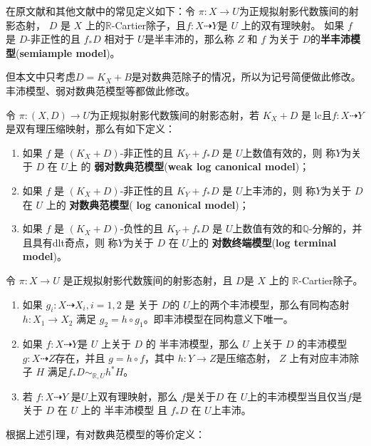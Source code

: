 \begin{remark}
  在原文献和其他文献中的常见定义如下：令 $ \pi:X\to U $为正规拟射影代数簇间的射影态射， $D$ 是 $X$ 上的$\mathbb{R}$-Cartier除子，且$ f: X\dashrightarrow Y $是 $U$ 上的双有理映射。  如果 $ f $ 是 $ D $-非正性的且 $ f_*D $ 相对于 $ U $是半丰沛的，那么称 $Z$ 和 $f$ 为关于 $D$的\textbf{半丰沛模型}(\textbf{semiample model})。

  但本文中只考虑$D=K_{X}+B$是对数典范除子的情况，所以为记号简便做此修改。丰沛模型、弱对数典范模型等都做此修改。
\end{remark}
\begin{definition}\label{models}
  \cite[Definition 3.6.7]{BCHM10} 令 $ \pi:(X,D)\to U $为正规拟射影代数簇间的射影态射，若 $ K_X+D $ 是 lc且$ f:X\dashrightarrow Y $是双有理压缩映射，那么有如下定义：
  \begin{enumerate}
    \item 如果 $f$ 是  $ (K_X+D) $-非正性的且 $ K_Y+f_*D $ 是 $ U $上数值有效的，则  称$ Y $为关于 $D$ 在 $U$上 的  \textbf{弱对数典范模型}(\textbf{weak log canonical model})；
    \item 如果 $f$ 是  $ (K_X+D) $-非正性的且 $ K_Y+f_*D $ 是 $ U $上丰沛的，则  称$ Y $为关于 $D$ 在 $U$ 上的  \textbf{对数典范模型}(\textbf{ log canonical model})；
    \item 如果 $f$ 是  $ (K_X+D) $-负性的且 $ K_Y+f_*D $ 是 $ U $上数值有效的和$\mathbb{Q}$-分解的，并且具有dlt奇点，则  称$ Y $为关于 $D$ 在 $U$上的  \textbf{对数终端模型}(\textbf{log terminal model})。
  \end{enumerate}
\end{definition}

\begin{lemma}\cite[lemma 3.6.6]{BCHM10}
  令 $\pi:X \to U$ 是正规拟射影代数簇间的射影态射，且 $D$是 $X$ 上的 $\mathbb{R}$-Cartier除子。

  \begin{enumerate}
    \item 如果 $g_{i}:X \dashrightarrow X_{i}, i=1,2$ 是 关于 $D$的  $U$上的两个丰沛模型，那么有同构态射 $h:X_{1}\to X_{2}$ 满足 $g_{2}=h \circ g_{1}$。即丰沛模型在同构意义下唯一。
    \item 如果 $f:X \dashrightarrow Y$是 $U$ 上关于 $D$ 的 半丰沛模型，那么 $U$ 上关于 $D$ 的丰沛模型 $g:X \dashrightarrow  Z$存在，并且 $g=h \circ f$，其中 $h:Y \to Z$是压缩态射， $Z$ 上有对应丰沛除子 $H$  满足$f_*D \sim_{\mathbb{R},U}h^*H$。
    \item  若 $f:X \dashrightarrow Y$  是$U$上双有理映射，那么 $f$是关于$D$ 在 $U$上的丰沛模型当且仅当$f$是关于 $D$ 在 $U$ 上的  半丰沛模型 且 $f_*D$ 在 $U$上丰沛。
  \end{enumerate}
\end{lemma}
根据上述引理，有对数典范模型的等价定义：

